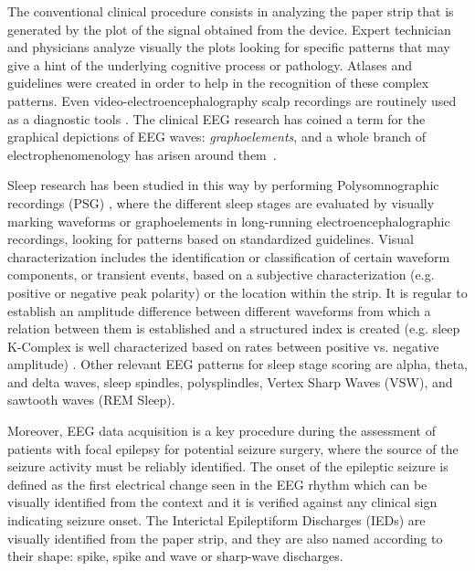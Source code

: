The conventional clinical procedure consists in analyzing the paper strip that is generated by the plot of the signal obtained from the device.  Expert technician and physicians analyze visually the plots looking for specific patterns that may give a hint of the underlying cognitive process or pathology.   Atlases and guidelines were created in order to help in the recognition of these complex patterns.   Even video-electroencephalography scalp recordings are routinely used as a diagnostic tools \cite{Giagante2003}. The clinical EEG research has coined a term for the graphical depictions of EEG waves: \textit{graphoelements}, and a whole branch of electrophenomenology has arisen around them~\cite{Schomer2010}.


Sleep research has been studied in this way by performing Polysomnographic recordings (PSG)  \cite{Rodenbeck2006}, where the different sleep stages are evaluated by visually marking waveforms or graphoelements in long-running electroencephalographic recordings, looking for patterns based on standardized guidelines.   Visual characterization includes the identification or classification of certain waveform components, or transient events, based on a subjective characterization (e.g. positive or negative peak polarity) or the location within the strip.  It is regular to establish an amplitude difference between different waveforms from which a relation between them is established and a structured index is created (e.g. sleep K-Complex is well characterized based on rates between positive vs. negative amplitude) \cite{Uchida1999}.  Other relevant EEG patterns for sleep stage scoring are alpha, theta, and delta waves,  sleep spindles, polysplindles, Vertex Sharp Waves (VSW), and sawtooth waves (REM Sleep).

Moreover, EEG data acquisition is a key procedure during the assessment of patients with focal epilepsy for potential seizure surgery, where the source of the seizure activity must be reliably identified. The onset of the epileptic seizure is defined as the first electrical change seen in the EEG rhythm which can be visually identified from the context and it is verified against any clinical sign indicating seizure onset.  The Interictal Epileptiform Discharges (IEDs) are visually identified from the paper strip, and they are also named according to their shape: spike, spike and wave or sharp-wave discharges\cite{EEGIntro}.  


